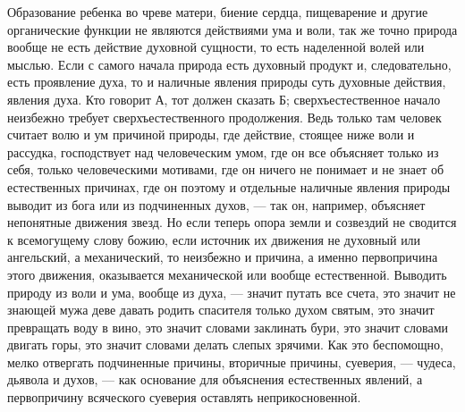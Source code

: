 \documentclass[12pt,oneside]{book}
\begin{document}
Образование ребенка во чреве матери, биение сердца, пищеварение и другие органические функции не являются действиями ума и воли, так же точно природа вообще не есть действие духовной сущности, то есть наделенной волей или мыслью. Если с самого начала природа есть духовный продукт и, следовательно, есть проявление духа, то и наличные явления природы суть духовные действия, явления духа. Кто говорит А, тот должен сказать Б; сверхъестественное начало неизбежно требует сверхъестественного продолжения. Ведь только там человек считает волю и ум причиной природы, где действие, стоящее ниже воли и рассудка, господствует над человеческим умом, где он все объясняет только из себя, только человеческими мотивами, где он ничего не понимает и не знает об естественных причинах, где он поэтому и отдельные наличные явления природы выводит из бога или из подчиненных духов, --- так он, например, объясняет непонятные движения звезд. Но если теперь опора земли и созвездий не сводится к всемогущему слову божию, если источник их движения не духовный или ангельский, а механический, то неизбежно и причина, а именно первопричина этого движения, оказывается механической или вообще естественной. Выводить природу из воли и ума, вообще из духа, --- значит путать все счета, это значит не знающей мужа деве давать родить спасителя только духом святым, это значит превращать воду в вино, это значит словами заклинать бури, это значит словами двигать горы, это значит словами делать слепых зрячими. Как это беспомощно, мелко отвергать подчиненные причины, вторичные причины, суеверия, --- чудеса, дьявола и духов, --- как основание для объяснения естественных явлений, а первопричину всяческого суеверия оставлять неприкосновенной.



\chapter{}
\end{document}
